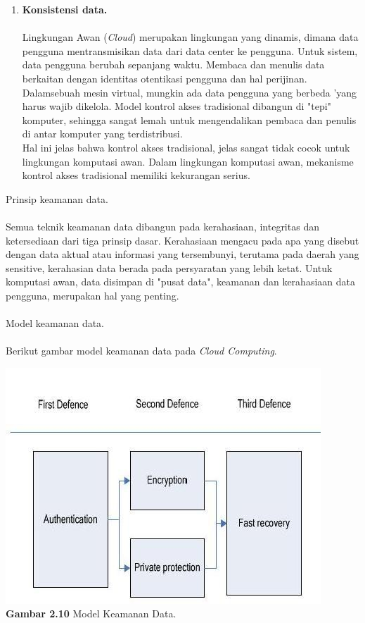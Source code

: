 \begin{enumerate}[label=\alph*]
\item \textbf{Konsistensi data.}\\\\
Lingkungan Awan (\textit{Cloud}) merupakan lingkungan yang dinamis, dimana data pengguna mentransmisikan data dari data center ke pengguna. Untuk sistem, data pengguna berubah sepanjang waktu. Membaca dan menulis data berkaitan dengan identitas otentikasi pengguna dan hal perijinan. Dalamsebuah mesin virtual, mungkin ada data pengguna yang berbeda 'yang harus wajib dikelola. Model  kontrol akses tradisional  dibangun di  "tepi" komputer, sehingga sangat lemah untuk mengendalikan pembaca dan penulis di antar komputer   yang terdistribusi.\\
\tab Hal ini jelas bahwa kontrol akses tradisional, jelas sangat tidak cocok untuk lingkungan komputasi awan. Dalam lingkungan komputasi awan, mekanisme kontrol akses tradisional memiliki  kekurangan serius.\\
\end{enumerate}
Prinsip keamanan data.\\\\
Semua teknik keamanan data dibangun pada kerahasiaan, integritas dan ketersediaan dari tiga prinsip dasar. Kerahasiaan mengacu pada apa yang disebut dengan data aktual atau informasi yang tersembunyi, terutama pada daerah yang sensitive, kerahasian data berada pada persyaratan yang lebih ketat. Untuk komputasi awan, data disimpan di "pusat data", keamanan dan kerahasiaan data pengguna, merupakan hal  yang penting.\\\\
Model  keamanan data.\\\\
Berikut gambar  model  keamanan data pada \textit{Cloud Computing}.\\
\begin{center}
\includegraphics[scale=1]{gambar210.jpg} \\
\textbf{Gambar  2.10} Model Keamanan Data. 
\end{center}
